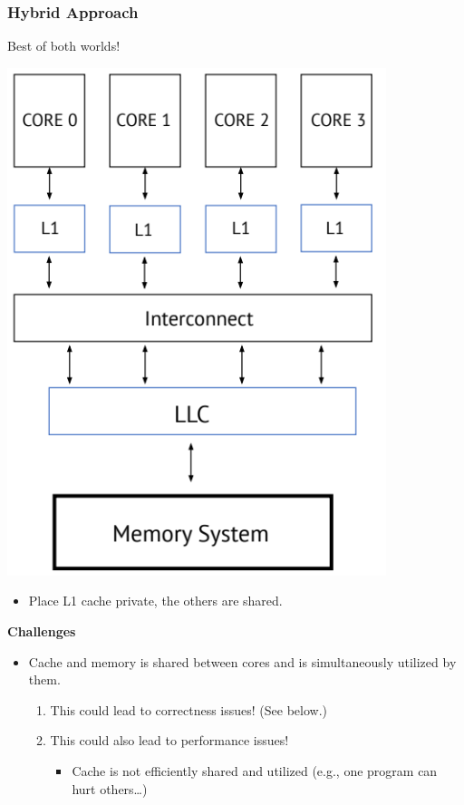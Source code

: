 \documentclass[10pt]{article}
\begin{document}
\subsubsection*{Hybrid Approach}
Best of both worlds!
\begin{center}
    \includegraphics*[scale=0.5]{W8_6.png}
\end{center}
\begin{itemize}
    \item Place L1 cache private, the others are shared.
\end{itemize}
\textbf{Challenges}
\begin{itemize}
    \item Cache and memory is shared between cores and is simultaneously utilized by them.
    \begin{enumerate}
        \item This could lead to correctness issues!  (See below.)
        \item This could also lead to performance issues!
        \begin{itemize}
            \item Cache is not efficiently shared and utilized (e.g., one program can hurt others\dots)
        \end{itemize}
    \end{enumerate}
\end{itemize}
\end{document}
